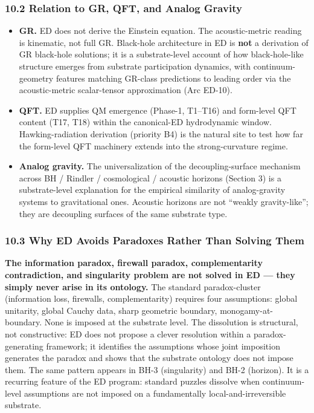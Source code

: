 \documentclass[
  11pt,
  a4paper,
]{article}
\providecommand{\tightlist}{%
  \setlength{\itemsep}{0pt}\setlength{\parskip}{0pt}}
\begin{document}
\subsubsection{10.2 Relation to GR, QFT, and Analog
Gravity}\label{relation-to-gr-qft-and-analog-gravity}

\begin{itemize}
\tightlist
\item
  \textbf{GR.} ED does not derive the Einstein equation. The
  acoustic-metric reading is kinematic, not full GR. Black-hole
  architecture in ED is \textbf{not} a derivation of GR black-hole
  solutions; it is a substrate-level account of how black-hole-like
  structure emerges from substrate participation dynamics, with
  continuum-geometry features matching GR-class predictions to leading
  order via the acoustic-metric scalar-tensor approximation (Arc ED-10).
\item
  \textbf{QFT.} ED supplies QM emergence (Phase-1, T1--T16) and
  form-level QFT content (T17, T18) within the canonical-ED hydrodynamic
  window. Hawking-radiation derivation (priority B4) is the natural site
  to test how far the form-level QFT machinery extends into the
  strong-curvature regime.
\item
  \textbf{Analog gravity.} The universalization of the
  decoupling-surface mechanism across BH / Rindler / cosmological /
  acoustic horizons (Section 3) is a substrate-level explanation for the
  empirical similarity of analog-gravity systems to gravitational ones.
  Acoustic horizons are not ``weakly gravity-like''; they are decoupling
  surfaces of the same substrate type.
\end{itemize}

\subsubsection{10.3 Why ED Avoids Paradoxes Rather Than Solving
Them}\label{why-ed-avoids-paradoxes-rather-than-solving-them}

\textbf{The information paradox, firewall paradox, complementarity
contradiction, and singularity problem are not solved in ED --- they
simply never arise in its ontology.} The standard paradox-cluster
(information loss, firewalls, complementarity) requires four
assumptions: global unitarity, global Cauchy data, sharp geometric
boundary, monogamy-at-boundary. None is imposed at the substrate level.
The dissolution is structural, not constructive: ED does not propose a
clever resolution within a paradox-generating framework; it identifies
the assumptions whose joint imposition generates the paradox and shows
that the substrate ontology does not impose them. The same pattern
appears in BH-3 (singularity) and BH-2 (horizon). It is a recurring
feature of the ED program: standard puzzles dissolve when
continuum-level assumptions are not imposed on a fundamentally
local-and-irreversible substrate.
\end{document}
